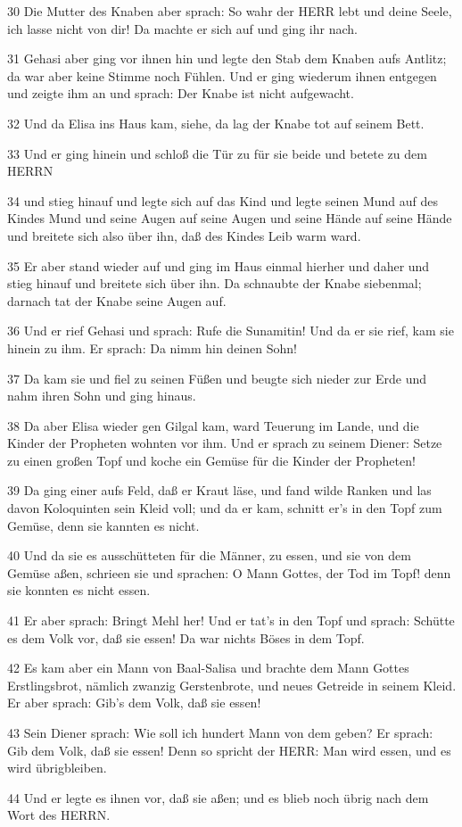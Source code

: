 \par 30 Die Mutter des Knaben aber sprach: So wahr der HERR lebt und deine Seele, ich lasse nicht von dir! Da machte er sich auf und ging ihr nach.
\par 31 Gehasi aber ging vor ihnen hin und legte den Stab dem Knaben aufs Antlitz; da war aber keine Stimme noch Fühlen. Und er ging wiederum ihnen entgegen und zeigte ihm an und sprach: Der Knabe ist nicht aufgewacht.
\par 32 Und da Elisa ins Haus kam, siehe, da lag der Knabe tot auf seinem Bett.
\par 33 Und er ging hinein und schloß die Tür zu für sie beide und betete zu dem HERRN
\par 34 und stieg hinauf und legte sich auf das Kind und legte seinen Mund auf des Kindes Mund und seine Augen auf seine Augen und seine Hände auf seine Hände und breitete sich also über ihn, daß des Kindes Leib warm ward.
\par 35 Er aber stand wieder auf und ging im Haus einmal hierher und daher und stieg hinauf und breitete sich über ihn. Da schnaubte der Knabe siebenmal; darnach tat der Knabe seine Augen auf.
\par 36 Und er rief Gehasi und sprach: Rufe die Sunamitin! Und da er sie rief, kam sie hinein zu ihm. Er sprach: Da nimm hin deinen Sohn!
\par 37 Da kam sie und fiel zu seinen Füßen und beugte sich nieder zur Erde und nahm ihren Sohn und ging hinaus.
\par 38 Da aber Elisa wieder gen Gilgal kam, ward Teuerung im Lande, und die Kinder der Propheten wohnten vor ihm. Und er sprach zu seinem Diener: Setze zu einen großen Topf und koche ein Gemüse für die Kinder der Propheten!
\par 39 Da ging einer aufs Feld, daß er Kraut läse, und fand wilde Ranken und las davon Koloquinten sein Kleid voll; und da er kam, schnitt er's in den Topf zum Gemüse, denn sie kannten es nicht.
\par 40 Und da sie es ausschütteten für die Männer, zu essen, und sie von dem Gemüse aßen, schrieen sie und sprachen: O Mann Gottes, der Tod im Topf! denn sie konnten es nicht essen.
\par 41 Er aber sprach: Bringt Mehl her! Und er tat's in den Topf und sprach: Schütte es dem Volk vor, daß sie essen! Da war nichts Böses in dem Topf.
\par 42 Es kam aber ein Mann von Baal-Salisa und brachte dem Mann Gottes Erstlingsbrot, nämlich zwanzig Gerstenbrote, und neues Getreide in seinem Kleid. Er aber sprach: Gib's dem Volk, daß sie essen!
\par 43 Sein Diener sprach: Wie soll ich hundert Mann von dem geben? Er sprach: Gib dem Volk, daß sie essen! Denn so spricht der HERR: Man wird essen, und es wird übrigbleiben.
\par 44 Und er legte es ihnen vor, daß sie aßen; und es blieb noch übrig nach dem Wort des HERRN.

